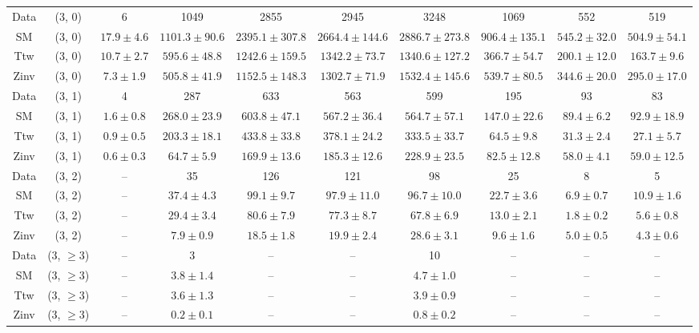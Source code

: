 \begin{table}[h!]
{\begin{tabular}{cccccccccc}
	Data & (3, 0) & 6 & 1049 & 2855 & 2945 & 3248 & 1069 & 552 & 519 \\[0.5ex] 
	SM & (3, 0) & $17.9\pm 4.6$ & $1101.3\pm 90.6$ & $2395.1\pm 307.8$ & $2664.4\pm 144.6$ & $2886.7\pm 273.8$ & $906.4\pm 135.1$ & $545.2\pm 32.0$ & $504.9\pm 54.1$ \\[0.5ex] 
	Ttw & (3, 0) & $10.7\pm 2.7$ & $595.6\pm 48.8$ & $1242.6\pm 159.5$ & $1342.2\pm 73.7$ & $1340.6\pm 127.2$ & $366.7\pm 54.7$ & $200.1\pm 12.0$ & $163.7\pm 9.6$ \\[0.5ex] 
	Zinv & (3, 0) & $7.3\pm 1.9$ & $505.8\pm 41.9$ & $1152.5\pm 148.3$ & $1302.7\pm 71.9$ & $1532.4\pm 145.6$ & $539.7\pm 80.5$ & $344.6\pm 20.0$ & $295.0\pm 17.0$ \\[0.5ex] 
	Data & (3, 1) & 4 & 287 & 633 & 563 & 599 & 195 & 93 & 83 \\[0.5ex] 
	SM & (3, 1) & $1.6\pm 0.8$ & $268.0\pm 23.9$ & $603.8\pm 47.1$ & $567.2\pm 36.4$ & $564.7\pm 57.1$ & $147.0\pm 22.6$ & $89.4\pm 6.2$ & $92.9\pm 18.9$ \\[0.5ex] 
	Ttw & (3, 1) & $0.9\pm 0.5$ & $203.3\pm 18.1$ & $433.8\pm 33.8$ & $378.1\pm 24.2$ & $333.5\pm 33.7$ & $64.5\pm 9.8$ & $31.3\pm 2.4$ & $27.1\pm 5.7$ \\[0.5ex] 
	Zinv & (3, 1) & $0.6\pm 0.3$ & $64.7\pm 5.9$ & $169.9\pm 13.6$ & $185.3\pm 12.6$ & $228.9\pm 23.5$ & $82.5\pm 12.8$ & $58.0\pm 4.1$ & $59.0\pm 12.5$ \\[0.5ex] 
	Data & (3, 2) & -- & 35 & 126 & 121 & 98 & 25 & 8 & 5 \\[0.5ex] 
	SM & (3, 2) & -- & $37.4\pm 4.3$ & $99.1\pm 9.7$ & $97.9\pm 11.0$ & $96.7\pm 10.0$ & $22.7\pm 3.6$ & $6.9\pm 0.7$ & $10.9\pm 1.6$ \\[0.5ex] 
	Ttw & (3, 2) & -- & $29.4\pm 3.4$ & $80.6\pm 7.9$ & $77.3\pm 8.7$ & $67.8\pm 6.9$ & $13.0\pm 2.1$ & $1.8\pm 0.2$ & $5.6\pm 0.8$ \\[0.5ex] 
	Zinv & (3, 2) & -- & $7.9\pm 0.9$ & $18.5\pm 1.8$ & $19.9\pm 2.4$ & $28.6\pm 3.1$ & $9.6\pm 1.6$ & $5.0\pm 0.5$ & $4.3\pm 0.6$ \\[0.5ex] 
	Data & (3, $\ge3$) & -- & 3 & -- & -- & 10 & -- & -- & -- \\[0.5ex] 
	SM & (3, $\ge3$) & -- & $3.8\pm 1.4$ & -- & -- & $4.7\pm 1.0$ & -- & -- & -- \\[0.5ex] 
	Ttw & (3, $\ge3$) & -- & $3.6\pm 1.3$ & -- & -- & $3.9\pm 0.9$ & -- & -- & -- \\[0.5ex] 
	Zinv & (3, $\ge3$) & -- & $0.2\pm 0.1$ & -- & -- & $0.8\pm 0.2$ & -- & -- & -- \\[0.5ex] 

\end{tabular}}
\end{table}
